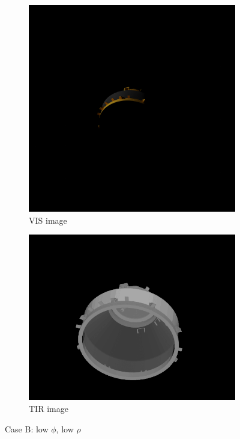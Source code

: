 \begin{figure}[!h]
\centering
\begin{subfigure}{0.2576\linewidth}
    \centering
    \includegraphics[width = \linewidth]{Images/Cas2Vis.png}
    \caption{VIS image}
    \label{fig:Cas2Vis}
\end{subfigure}\quad\quad\quad\quad\quad\quad\quad
\begin{subfigure}{0.32\linewidth}
    \centering
    \includegraphics[width = \linewidth]{Images/Cas2Tir.png}
    \caption{TIR image}
    \label{fig:Cas2Tir}
\end{subfigure}
\caption{Case B: low $\phi$, low $\rho$}
\label{fig:Cas2}
\end{figure}
